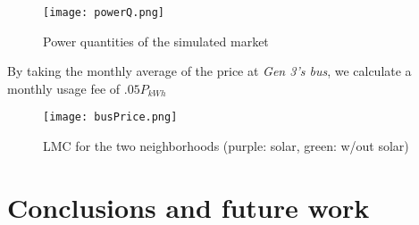 \documentclass{article}
\begin{document}
\begin{figure}[ht!]
	\centering
	\texttt{[image: powerQ.png]}
	\caption{Power quantities of the simulated market}
\end{figure}

By taking the monthly average of the price at \emph{Gen 3's bus}, we calculate a monthly usage fee of $.05P_{kWh}$

\begin{figure}[ht!]
	\centering
	\texttt{[image: busPrice.png]}
	\caption{LMC for the two neighborhoods (purple: solar, green: w/out solar)}
\end{figure}

\newpage
\section{Conclusions and future work}
\end{document}
